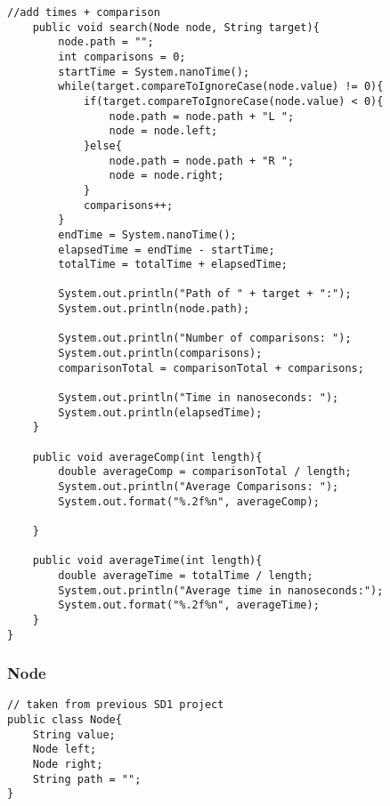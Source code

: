 \documentclass[10pt]{article}
\begin{document}
\begin{lstlisting}[frame=single, ]
    //add times + comparison
    public void search(Node node, String target){
        node.path = "";
        int comparisons = 0;
        startTime = System.nanoTime();
        while(target.compareToIgnoreCase(node.value) != 0){
            if(target.compareToIgnoreCase(node.value) < 0){
                node.path = node.path + "L ";
                node = node.left;
            }else{
                node.path = node.path + "R ";
                node = node.right;
            }
            comparisons++;
        }
        endTime = System.nanoTime();
        elapsedTime = endTime - startTime;
        totalTime = totalTime + elapsedTime;

        System.out.println("Path of " + target + ":");
        System.out.println(node.path);

        System.out.println("Number of comparisons: ");
        System.out.println(comparisons);
        comparisonTotal = comparisonTotal + comparisons;

        System.out.println("Time in nanoseconds: ");
        System.out.println(elapsedTime);
    }

    public void averageComp(int length){
        double averageComp = comparisonTotal / length;
        System.out.println("Average Comparisons: ");
        System.out.format("%.2f%n", averageComp);

    }

    public void averageTime(int length){
        double averageTime = totalTime / length;
        System.out.println("Average time in nanoseconds:");
        System.out.format("%.2f%n", averageTime);
    }
}
\end{lstlisting}


\subsubsection{Node}
\lstset{numbers=left, numberstyle=\tiny, stepnumber=1, numbersep=5pt, basicstyle=\footnotesize\ttfamily}
\begin{lstlisting}[frame=single, ]  
// taken from previous SD1 project
public class Node{
    String value;
    Node left;
    Node right;
    String path = "";
}
\end{lstlisting}
\end{document}
